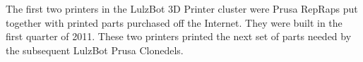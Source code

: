 %
%
%
%
%


The first two printers in the LulzBot 3D Printer cluster were Prusa
RepRaps put together with printed parts purchased off the Internet.
They were built in the first quarter of 2011.
These two printers printed the next set of parts needed by the
subsequent LulzBot Prusa Clonedels.




%

